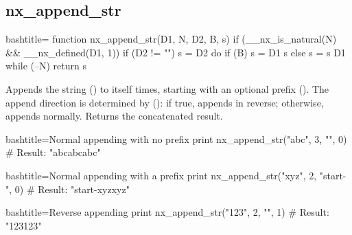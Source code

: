 \newpage
\subsection{nx_append_str}
\label{nx_append_str}
\begin{NexCodeBox}{bash}{title={}}
function nx_append_str(D1, N, D2, B, s) {
	if (__nx_is_natural(N) && __nx_defined(D1, 1)) {
		if (D2 != "")
			s = D2
		do {
			if (B)
				s = D1 s
			else
				s = s D1
		} while (--N)
		return s
	}
}
\end{NexCodeBox}


\begin{NexMainBox}
	\begin{NexMainBox}
		Appends the string () to itself  times, starting with an optional prefix (). The append direction is determined by (): if true, appends in reverse; otherwise, appends normally. Returns the concatenated result.
	\end{NexMainBox}
	\begin{NexMainBox}
		\begin{NexListDark}
		\end{NexListDark}
	\end{NexMainBox}
\end{NexMainBox}

\begin{NexCodeBox}{bash}{title={Normal appending with no prefix}}
	print nx_append_str("abc", 3, "", 0)
	# Result: "abcabcabc"
\end{NexCodeBox}

\begin{NexCodeBox}{bash}{title={Normal appending with a prefix}}
	print nx_append_str("xyz", 2, "start-", 0)
	# Result: "start-xyzxyz"
\end{NexCodeBox}

\begin{NexCodeBox}{bash}{title={Reverse appending}}
	print nx_append_str("123", 2, "", 1)
	# Result: "123123"
\end{NexCodeBox}

